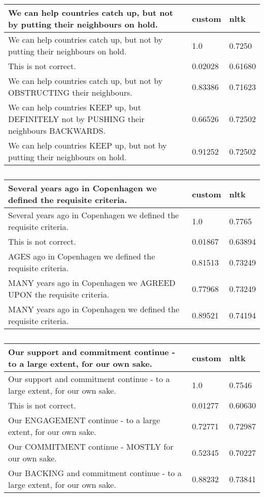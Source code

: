 \documentclass[a4paper,landscape]{article}
\begin{document}
\begin{table}
    \begin{tabular}{l l l}
      \toprule
      We can help countries catch up, but not by putting their neighbours on hold. & custom & nltk \\
      \midrule
      We can help countries catch up, but not by putting their neighbours on hold. & 1.0 & 0.7250 \\
      This is not correct. & 0.02028 & 0.61680 \\
      We can help countries catch up, but not by OBSTRUCTING their neighbours. & 0.83386 & 0.71623 \\
      We can help countries KEEP up, but DEFINITELY not by PUSHING their neighbours BACKWARDS. & 0.66526 & 0.72502 \\
      We can help countries KEEP up, but not by putting their neighbours on hold. & 0.91252 & 0.72502 \\
      \bottomrule
    \end{tabular}
  \caption{}
\end{table}

\begin{table}
  \begin{tabular}{l l l}
    \toprule
    Several years ago in Copenhagen we defined the requisite criteria. & custom & nltk \\
    \midrule
    Several years ago in Copenhagen we defined the requisite criteria. & 1.0 & 0.7765 \\
    This is not correct. & 0.01867 & 0.63894 \\
    AGES ago in Copenhagen we defined the requisite criteria. & 0.81513 & 0.73249 \\
    MANY years ago in Copenhagen we AGREED UPON the requisite criteria. & 0.77968 & 0.73249 \\
    MANY years ago in Copenhagen we defined the requisite criteria. & 0.89521 & 0.74194 \\
    \bottomrule
  \end{tabular}
  \caption{}
\end{table}

\begin{table}
  \begin{tabular}{l l l}
    \toprule
    Our support and commitment continue - to a large extent, for our own sake. & custom & nltk \\
    \midrule
    Our support and commitment continue - to a large extent, for our own sake. & 1.0 & 0.7546 \\
    This is not correct. & 0.01277 & 0.60630 \\
    Our ENGAGEMENT continue - to a large extent, for our own sake. & 0.72771 & 0.72987 \\
    Our COMMITMENT continue - MOSTLY for our own sake. & 0.52345 & 0.70227 \\
    Our BACKING and commitment continue - to a large extent, for our own sake. & 0.88232 & 0.73841 \\
    \bottomrule
  \end{tabular}
  \caption{}
\end{table}
\end{document}
